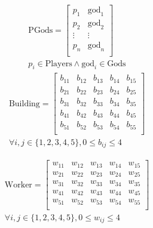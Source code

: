 \documentclass{telkomnika}
\begin{document}
\begin{equation}
    \begin{aligned}
    \text{PGods} = \begin{bmatrix}
    p_1 & \text{god}_1 \\
    p_2 & \text{god}_2 \\
    \vdots & \vdots \\
    p_n & \text{god}_n \\
    \end{bmatrix}\\
    p_i \in \text{Players} \land \text{god}_i \in \text{Gods}
    \end{aligned}
    \label{eq:playergods}
\end{equation}
\begin{equation}
    \begin{aligned}
    \text{Building} = \begin{bmatrix}
    b_{11} & b_{12} & b_{13} & b_{14} & b_{15} \\
    b_{21} & b_{22} & b_{23} & b_{24} & b_{25} \\
    b_{31} & b_{32} & b_{33} & b_{34} & b_{35} \\
    b_{41} & b_{42} & b_{43} & b_{44} & b_{45} \\
    b_{51} & b_{52} & b_{53} & b_{54} & b_{55} \\
    \end{bmatrix}\\
    \forall i,j \in \{1,2,3,4,5\}, 0 \leq b_{ij} \leq 4
    \end{aligned}
    \label{eq:board_build} 
\end{equation}

\begin{equation}
    \begin{aligned}
    \text{Worker} = \begin{bmatrix}
    w_{11} & w_{12} & w_{13} & w_{14} & w_{15} \\
    w_{21} & w_{22} & w_{23} & w_{24} & w_{25} \\
    w_{31} & w_{32} & w_{33} & w_{34} & w_{35} \\
    w_{41} & w_{42} & w_{43} & w_{44} & w_{45} \\
    w_{51} & w_{52} & w_{53} & w_{54} & w_{55} \\
    \end{bmatrix}\\
    \forall i,j \in \{1,2,3,4,5\}, 0 \leq w_{ij} \leq 4
    \end{aligned}
    \label{eq:board_worker} 
\end{equation}
\end{document}
